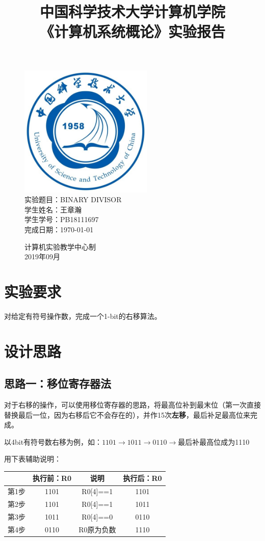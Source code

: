 \documentclass[UTF8]{article}
\title{中国科学技术大学计算机学院\\《计算机系统概论》实验报告}
\author{}
\date{}
\begin{document}
\maketitle
	\begin{figure}[H]
		\centering
		\includegraphics[width=2.5in]{xiaohui.jpg}\vspace{0.5cm}\\
		\large{
			实验题目：BINARY DIVISOR\\
			学生姓名：王章瀚\\
			学生学号：PB18111697\\
			完成日期：\today\\
		}\vspace{2cm}
		
		\large{计算机实验教学中心制\\2019年09月\\}
		\thispagestyle{empty}
		\clearpage  %
	\end{figure}
	\newpage
	
	\section{实验要求}
	对给定有符号操作数，完成一个1-bit的右移算法。\par

	\section{设计思路}
	\subsection{思路一：移位寄存器法}
	对于右移的操作，可以使用移位寄存器的思路，将最高位补到最末位（第一次直接替换最后一位，因为右移后它不会存在的），并作15次\textbf{左移}，最后补足最高位来完成。\par
	以4bit有符号数右移为例，如：$1101\rightarrow1011\rightarrow0110\rightarrow$最后补最高位成为1110\par
	用下表辅助说明：\par
	\begin{tabular}{|c|c|c|c|}
		\hline 
		& 执行前：R0 & 说明 & 执行后：R0 \\ 
		\hline 
		第1步 & 1101 & R0[4]==1 & 1101 \\ 
		\hline 
		第2步 & 1101 & R0[4]==1 & 1011 \\ 
		\hline 
		第3步 & 1011 & R0[4]==0 & 0110 \\ 
		\hline 
		第4步 & 0110 & R0原为负数 & 1110 \\ 
		\hline 
	\end{tabular} 
	
\end{document}
